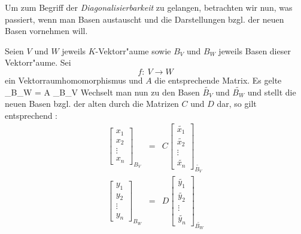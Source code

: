 Um zum Begriff der {\em Diagonalisierbarkeit} zu gelangen, betrachten wir
nun, was passiert, wenn man Basen austauscht und die Darstellungen bzgl. der
neuen Basen vornehmen will.

Seien $V$ und $W$ jeweils $K$-Vektorr"aume sowie $B_V$ und $B_W$ jeweils
Basen dieser Vektorr"aume. Sei \[ f: \: V \rightarrow W \] ein
Vektorraumhomomorphismus und $A$ die entsprechende Matrix. Es gelte
    _{B_W}
    = 
    A
    _{B_V}
\Eeq
Wechselt man nun zu den Basen $\tilde{B_V}$ und $\tilde{B_W}$ und stellt 
die neuen Basen bzgl. der alten durch die Matrizen $C$ und $D$ dar, so gilt
entsprechend :
\begin{eqnarray*}
    \left[
        \begin{array}{c} x_1\\ x_2\\ \vdots\\ x_n \end{array}
    \right]_{B_V} 
    & = & 
    C
    \left[
        \begin{array}{c} 
            \tilde{x_1}\\ 
            \tilde{x_2}\\ \vdots \\
            \tilde{x_n}
        \end{array}
    \right]_{\tilde{B_V}}
\\
    \left[
        \begin{array}{c} y_1\\ y_2\\ \vdots\\ y_n \end{array}
    \right]_{B_W}
    & = & 
    D
    \left[
        \begin{array}{c} 
            \tilde{y_1}\\ 
            \tilde{y_2}\\ \vdots \\
            \tilde{y_n}
        \end{array}
    \right]_{\tilde{B_W}}
\end{eqnarray*}

